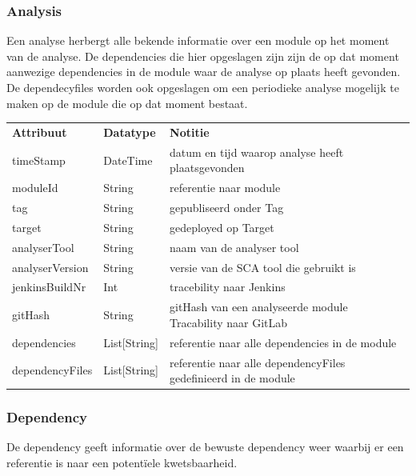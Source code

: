 \subsubsection{Analysis}\label{subsubsec:analysis}
Een analyse herbergt alle bekende informatie over een module op het moment van de analyse. De dependencies die hier opgeslagen zijn zijn de op dat moment aanwezige dependencies in de module waar de analyse op plaats heeft gevonden. De dependecyfiles worden ook opgeslagen om een periodieke analyse mogelijk te maken op de module die op dat moment bestaat.

\begin{tabular}{lll}
    \textbf{Attribuut} & \textbf{Datatype} & \textbf{Notitie}                                               \\
    timeStamp          & DateTime          & datum en tijd waarop analyse heeft plaatsgevonden              \\
    moduleId           & String            & referentie naar module                                         \\
    tag                & String            & gepubliseerd onder Tag                                         \\
    target             & String            & gedeployed op Target                                           \\
    analyserTool       & String            & naam van de analyser tool                                      \\
    analyserVersion    & String            & versie van de SCA tool die gebruikt is                         \\
    jenkinsBuildNr     & Int               & tracebility naar Jenkins                                       \\
    gitHash            & String            & gitHash van een analyseerde module Tracability naar GitLab     \\
    dependencies       & List[String]      & referentie naar alle dependencies in de module                 \\
    dependencyFiles    & List[String]      & referentie naar alle dependencyFiles gedefinieerd in de module \\
\end{tabular}

\subsubsection{Dependency}\label{subsubsec:dependency}
De dependency geeft informatie over de bewuste dependency weer waarbij er een referentie is naar een potentïele kwetsbaarheid.

